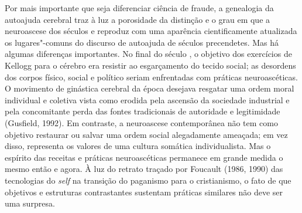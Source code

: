 Por mais importante que seja diferenciar ciência de fraude, a genealogia
da autoajuda cerebral traz à luz a porosidade da distinção e o grau em
que a neuroascese dos séculos  e  reproduz com uma aparência
cientificamente atualizada os lugares"-comuns do discurso de autoajuda de
séculos precendetes. Mas há algumas diferenças importantes. No final do
século , o objetivo dos exercícios de Kellogg para o cérebro era
resistir ao esgarçamento do tecido social; as desordens dos corpos
físico, social e político seriam enfrentadas com práticas
neuroascéticas. O movimento de ginástica cerebral da época desejava
resgatar uma ordem moral individual e coletiva vista como erodida pela
ascensão da sociedade industrial e pela concomitante perda das fontes
tradicionais de autoridade e legitimidade (Gusfield, 1992). Em
contraste, a neuroascese contemporânea não tem como objetivo restaurar
ou salvar uma ordem social alegadamente ameaçada; em vez disso,
representa os valores de uma cultura somática individualista. Mas o
espírito das receitas e práticas neuroascéticas permanece em grande
medida o mesmo então e agora. À luz do retrato traçado por Foucault
(1986, 1990) das tecnologias do \emph{self} na transição do paganismo para o
cristianismo, o fato de que objetivos e estruturas contrastantes
sustentam práticas similares não deve ser uma surpresa.


